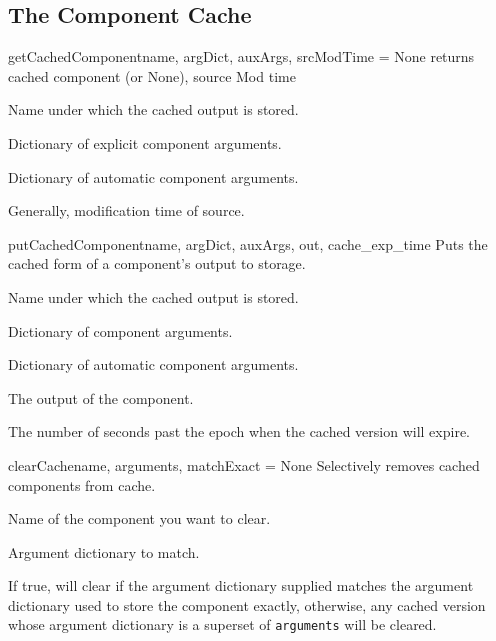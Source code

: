 \subsection{The Component Cache}
\begin{funcdesc}{getCachedComponent}{name, argDict, auxArgs, srcModTime = None}
returns cached component (or None),  source Mod time
\begin{argdesc}
\item[name] Name under which the cached output is stored.
\item[argDict] Dictionary of explicit component arguments.  
\item[auxArgs] Dictionary of automatic component arguments.
\item[srcModTime] Generally, modification time of source.
\end{argdesc}
\end{funcdesc}


\begin{funcdesc}{putCachedComponent}{name, argDict, auxArgs, out, cache_exp_time}
Puts the cached form of a component's output to storage.
\begin{argdesc}
\item[name]  Name under which the cached output is stored. 
\item[argDict] Dictionary of component arguments.  
\item[auxArgs]  Dictionary of automatic component arguments.
\item[out] The output of the component.
\item[cache_exp_time] The number of seconds past the epoch when the
cached version will expire.
\end{argdesc}
\end{funcdesc}


\begin{funcdesc}{clearCache}{name, arguments, matchExact = None}
Selectively removes cached components from cache.
\begin{argdesc}
\item[name] Name of the component you want to clear.
\item[arguments] Argument dictionary to match.
\item[matchExact] If true, will clear  if the argument
dictionary supplied matches the argument dictionary used to store the
component exactly, otherwise, any cached version whose argument
dictionary is a superset of \texttt{arguments} will be cleared.
\end{argdesc}

\end{funcdesc}

